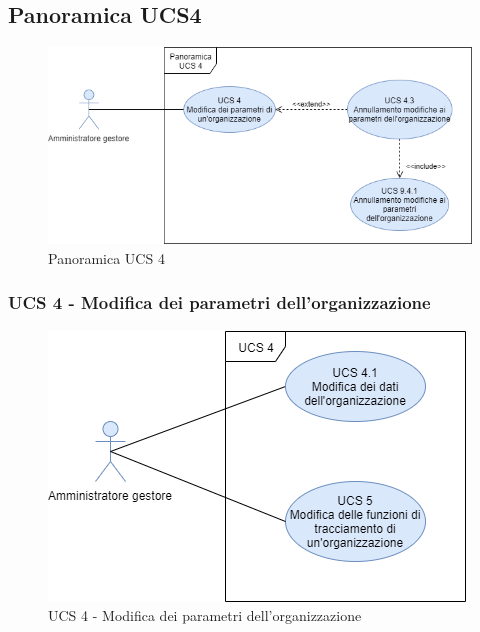 \subsection{Panoramica UCS4}

\begin{figure}[h]
	\centering	
	\includegraphics[scale=0.53]{sezioni/UseCase/Immagini/PS4.png}
	\caption{Panoramica UCS 4}
\end{figure}

\subsubsection{UCS 4 - Modifica dei parametri dell'organizzazione}%

\begin{figure}[h]
	\centering	
	\includegraphics[scale=0.53]{sezioni/UseCase/Immagini/UCS4.png}
	\caption{UCS 4 - Modifica dei parametri dell'organizzazione}
\end{figure}

